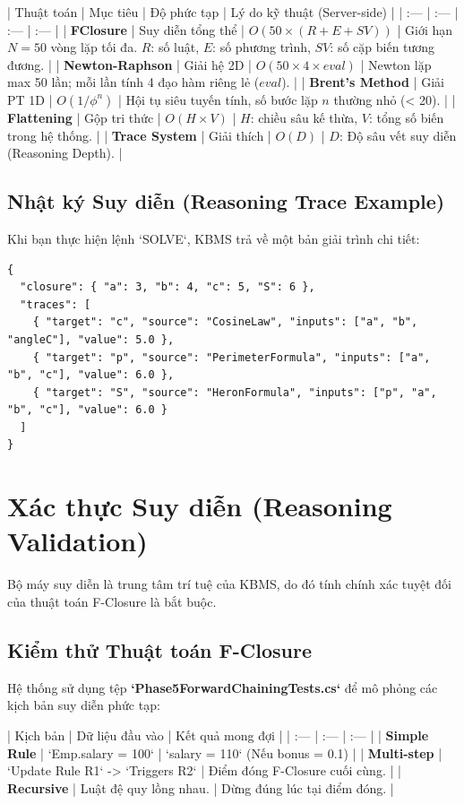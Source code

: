 | Thuật toán | Mục tiêu | Độ phức tạp | Lý do kỹ thuật (Server-side) |
| :--- | :--- | :--- | :--- |
| \textbf{FClosure} | Suy diễn tổng thể | $O(50 \times (R + E + SV))$ | Giới hạn $N=50$ vòng lặp tối đa. $R$: số luật, $E$: số phương trình, $SV$: số cặp biến tương đương. |
| \textbf{Newton-Raphson} | Giải hệ 2D | $O(50 \times 4 \times eval)$ | Newton lặp max 50 lần; mỗi lần tính 4 đạo hàm riêng lẻ ($eval$). |
| \textbf{Brent's Method} | Giải PT 1D | $O(1/\phi^n)$ | Hội tụ siêu tuyến tính, số bước lặp $n$ thường nhỏ (< 20). |
| \textbf{Flattening} | Gộp tri thức | $O(H \times V)$ | $H$: chiều sâu kế thừa, $V$: tổng số biến trong hệ thống. |
| \textbf{Trace System} | Giải thích | $O(D)$ | $D$: Độ sâu vết suy diễn (Reasoning Depth). |

\subsection{Nhật ký Suy diễn (Reasoning Trace Example)}

Khi bạn thực hiện lệnh `SOLVE`, KBMS trả về một bản giải trình chi tiết:

\begin{verbatim}
{
  "closure": { "a": 3, "b": 4, "c": 5, "S": 6 },
  "traces": [
    { "target": "c", "source": "CosineLaw", "inputs": ["a", "b", "angleC"], "value": 5.0 },
    { "target": "p", "source": "PerimeterFormula", "inputs": ["a", "b", "c"], "value": 6.0 },
    { "target": "S", "source": "HeronFormula", "inputs": ["p", "a", "b", "c"], "value": 6.0 }
  ]
}
\end{verbatim}

\section{Xác thực Suy diễn (Reasoning Validation)}

Bộ máy suy diễn là trung tâm trí tuệ của KBMS, do đó tính chính xác tuyệt đối của thuật toán F-Closure là bắt buộc.

\subsection{Kiểm thử Thuật toán F-Closure}

Hệ thống sử dụng tệp \textbf{`Phase5ForwardChainingTests.cs`} để mô phỏng các kịch bản suy diễn phức tạp:

| Kịch bản | Dữ liệu đầu vào | Kết quả mong đợi |
| :--- | :--- | :--- |
| \textbf{Simple Rule} | `Emp.salary = 100` | `salary = 110` (Nếu bonus = 0.1) |
| \textbf{Multi-step} | `Update Rule R1` -> `Triggers R2` | Điểm đóng F-Closure cuối cùng. |
| \textbf{Recursive} | Luật đệ quy lồng nhau. | Dừng đúng lúc tại điểm đóng. |

